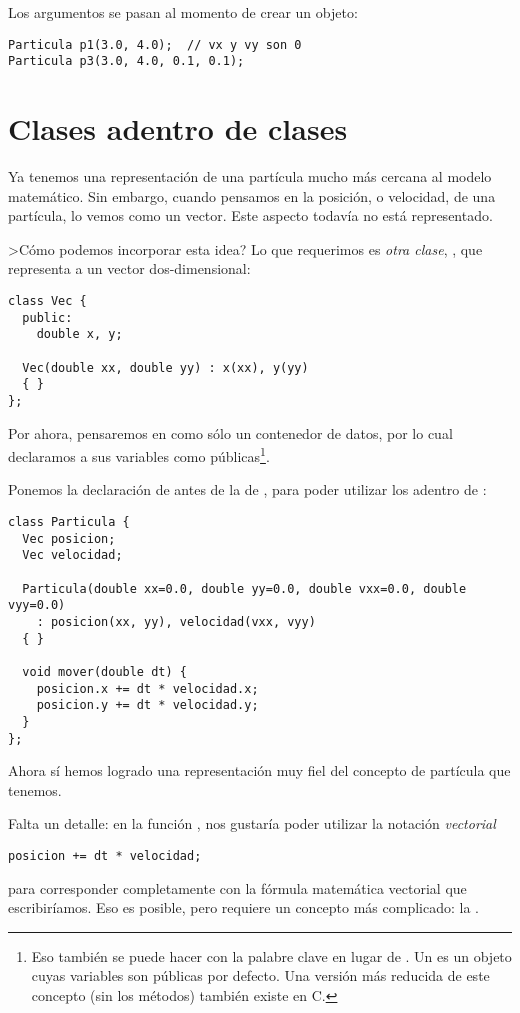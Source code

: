 Los argumentos se pasan al momento de crear un objeto:
\begin{lstlisting}
Particula p1(3.0, 4.0);  // vx y vy son 0
Particula p3(3.0, 4.0, 0.1, 0.1);
\end{lstlisting}

\section{Clases adentro de clases}
Ya tenemos una representación de una partícula mucho más cercana al modelo matemático.
Sin embargo, cuando pensamos en la posición, o velocidad, de una partícula, lo vemos como un vector.
Este aspecto todavía no está representado.

>Cómo podemos incorporar esta idea? Lo que requerimos es \emph{otra clase}, , que representa a un vector dos-dimensional:
\begin{lstlisting}
class Vec {
  public:
    double x, y;

  Vec(double xx, double yy) : x(xx), y(yy) 
  { }
};
\end{lstlisting}
Por ahora, pensaremos en  como sólo un contenedor de datos, por lo cual declaramos a sus variables como públicas\footnote{Eso también se puede hacer con la palabre clave  en lugar de . Un  es un objeto cuyas variables son públicas por defecto. Una versión más reducida de este concepto (sin los métodos) también existe en C.}.

Ponemos la declaración de  antes de la de , para poder utilizar los  adentro de :
\begin{lstlisting}
class Particula {
  Vec posicion;
  Vec velocidad;

  Particula(double xx=0.0, double yy=0.0, double vxx=0.0, double vyy=0.0) 
    : posicion(xx, yy), velocidad(vxx, vyy) 
  { }

  void mover(double dt) {
    posicion.x += dt * velocidad.x;
    posicion.y += dt * velocidad.y;
  }
};
\end{lstlisting}
Ahora sí hemos logrado una representación muy fiel del concepto de partícula que tenemos.

Falta un detalle: en la función , nos gustaría poder utilizar la notación \emph{vectorial}
\begin{lstlisting}
posicion += dt * velocidad;
\end{lstlisting}
para corresponder completamente con la fórmula matemática vectorial que escribiríamos.
Eso es posible, pero requiere un concepto más complicado: la .



